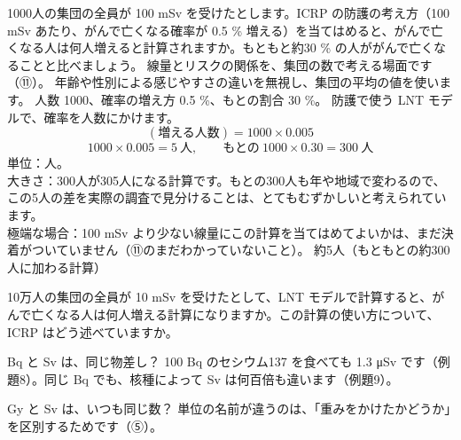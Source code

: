 \label{ph:原-14:ex13}
\begin{phreidai}
1000人の集団の全員が 100 mSv を受けたとします。ICRP の防護の考え方（100 mSv あたり、がんで亡くなる確率が 0.5 \% 増える）を当てはめると、がんで亡くなる人は何人増えると計算されますか。もともと約30 \% の人ががんで亡くなることと比べましょう。
\phbamen
線量とリスクの関係を、集団の数で考える場面です（⑪）。
\phmushi
年齢や性別による感じやすさの違いを無視し、集団の平均の値を使います。
\phzu
人数 1000、確率の増え方 0.5 \%、もとの割合 30 \%。
\phriyu
防護で使う LNT モデルで、確率を人数にかけます。
\phtateru
\[ (\text{増える人数})=1000\times0.005 \]
\phtoku
\[ 1000\times0.005=5\ \text{人},\qquad \text{もとの}\ 1000\times0.30=300\ \text{人} \]
\phtashikame
単位：人。\\
大きさ：300人が305人になる計算です。もとの300人も年や地域で変わるので、この5人の差を実際の調査で見分けることは、とてもむずかしいと考えられています。\\
極端な場合：100 mSv より少ない線量にこの計算を当てはめてよいかは、まだ決着がついていません（⑪のまだわかっていないこと）。
\kotae 約5人（もともとの約300人に加わる計算）
\end{phreidai}
\begin{jibun}
10万人の集団の全員が 10 mSv を受けたとして、LNT モデルで計算すると、がんで亡くなる人は何人増える計算になりますか。この計算の使い方について、ICRP はどう述べていますか。
\end{jibun}

\begin{tsumazuki}{Bq と Sv は、同じ物差し？}
100 Bq のセシウム137 を食べても 1.3 \si{\micro Sv} です（例題8）。同じ Bq でも、核種によって Sv は何百倍も違います（例題9）。
\end{tsumazuki}

\begin{tsumazuki}{Gy と Sv は、いつも同じ数？}
単位の名前が違うのは、「重みをかけたかどうか」を区別するためです（⑤）。
\end{tsumazuki}

